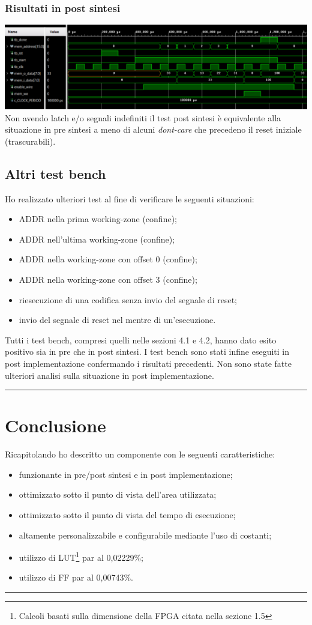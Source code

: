 \documentclass{article}
\begin{document}
\subsubsection{Risultati in post sintesi}
\includegraphics[width=\textwidth]{tb1-ps.png}
Non avendo latch e/o segnali indefiniti il test post sintesi è equivalente alla situazione in pre sintesi a meno di alcuni \textit{dont-care} che precedeno il reset iniziale (trascurabili).
\subsection{Altri test bench}
Ho realizzato ulteriori test al fine di verificare le seguenti situazioni:
\begin{itemize}
	\item ADDR nella prima working-zone (confine);
	\item ADDR nell'ultima working-zone (confine);
	\item ADDR nella working-zone con offset 0 (confine);
	\item ADDR nella working-zone con offset 3 (confine);
	\item riesecuzione di una codifica senza invio del segnale di reset;
	\item invio del segnale di reset nel mentre di un'esecuzione.
\end{itemize}
Tutti i test bench, compresi quelli nelle sezioni 4.1 e 4.2, hanno dato esito positivo sia in pre che in post sintesi.
I test bench sono stati infine eseguiti in post implementazione confermando i risultati precedenti.
Non sono state fatte ulteriori analisi sulla situazione in post implementazione.

\noindent\rule{\textwidth}{0.5pt}
\newpage
\section{Conclusione}
Ricapitolando ho descritto un componente con le seguenti caratteristiche:
\begin{itemize}
	\item funzionante in pre/post sintesi e in post implementazione;
	\item ottimizzato sotto il punto di vista dell'area utilizzata;
	\item ottimizzato sotto il punto di vista del tempo di esecuzione;
	\item altamente personalizzabile e configurabile mediante l'uso di costanti;
	\item utilizzo di LUT\footnote{Calcoli basati sulla dimensione della FPGA citata nella sezione 1.5\label{fn}}  par al 0,02229\%;
	\item utilizzo di FF par al 0,00743\%.
\end{itemize}

\noindent\rule{\textwidth}{0.5pt}
\end{document}
